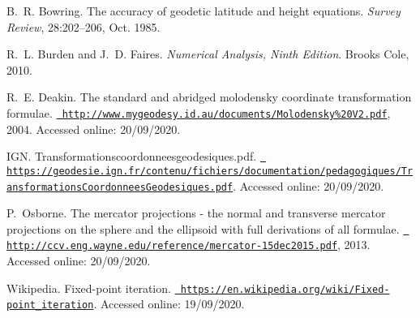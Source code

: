 
\begin{DoxyDescription}
\item[\label{citelist_CITEREF_Bowring_85}%
\Hypertarget{citelist_CITEREF_Bowring_85}%
\mbox{[}1\mbox{]}]B.~R. Bowring. The accuracy of geodetic latitude and height equations. {\itshape Survey Review}, 28\+:202--206, Oct. 1985.


\item[\label{citelist_CITEREF_Burden_10}%
\Hypertarget{citelist_CITEREF_Burden_10}%
\mbox{[}2\mbox{]}]R.~L. Burden and J.~D. Faires. {\itshape Numerical Analysis, Ninth Edition}. Brooks Cole, 2010.


\item[\label{citelist_CITEREF_Deakin_04}%
\Hypertarget{citelist_CITEREF_Deakin_04}%
\mbox{[}3\mbox{]}]R.~E. Deakin. The standard and abridged molodensky coordinate transformation formulae. \href{http://www.mygeodesy.id.au/documents/Molodensky\%20V2.pdf}{\texttt{ http\+://www.\+mygeodesy.\+id.\+au/documents/\+Molodensky\%20\+V2.\+pdf}}, 2004. Accessed online\+: 20/09/2020.


\item[\label{citelist_CITEREF_IGN_TCG}%
\Hypertarget{citelist_CITEREF_IGN_TCG}%
\mbox{[}4\mbox{]}]I\+GN. Transformationscoordonneesgeodesiques.\+pdf. \href{https://geodesie.ign.fr/contenu/fichiers/documentation/pedagogiques/TransformationsCoordonneesGeodesiques.pdf}{\texttt{ https\+://geodesie.\+ign.\+fr/contenu/fichiers/documentation/pedagogiques/\+Transformations\+Coordonnees\+Geodesiques.\+pdf}}. Accessed online\+: 20/09/2020.


\item[\label{citelist_CITEREF_Osborne_13}%
\Hypertarget{citelist_CITEREF_Osborne_13}%
\mbox{[}5\mbox{]}]P.~Osborne. The mercator projections -\/ the normal and transverse mercator projections on the sphere and the ellipsoid with full derivations of all formulae. \href{http://ccv.eng.wayne.edu/reference/mercator-15dec2015.pdf}{\texttt{ http\+://ccv.\+eng.\+wayne.\+edu/reference/mercator-\/15dec2015.\+pdf}}, 2013. Accessed online\+: 20/09/2020.


\item[\label{citelist_CITEREF_WIKI_Fixed_Point_Iteration}%
\Hypertarget{citelist_CITEREF_WIKI_Fixed_Point_Iteration}%
\mbox{[}Wikipedia\mbox{]}]Wikipedia. Fixed-\/point iteration. \href{https://en.wikipedia.org/wiki/Fixed-point_iteration}{\texttt{ https\+://en.\+wikipedia.\+org/wiki/\+Fixed-\/point\+\_\+iteration}}. Accessed online\+: 19/09/2020.


\end{DoxyDescription}